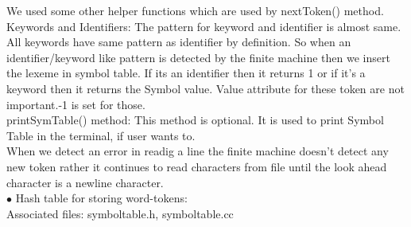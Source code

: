 \documentclass[paper=letter, fontsize=11pt]{scrartcl} %
\begin{document}
We used some other helper functions which are used by nextToken() method.\\

Keywords and Identifiers: The pattern for keyword and identifier is almost same. All keywords have same pattern as identifier by definition. So when an identifier/keyword like pattern is detected by the finite machine then we insert the lexeme in symbol table. If its an identifier then it returns 1 or if it's a keyword then it returns the Symbol value. Value attribute for these token are not important.-1 is set for those.\\

printSymTable() method: This method is optional. It is used to print Symbol Table in the terminal, if user wants to.\\

When we detect an error in readig a line the finite machine doesn't detect any new token rather it continues to read characters from file until the look ahead character is a newline character.\\

$\bullet$ Hash table for storing word-tokens: \\

Associated files: symboltable.h, symboltable.cc\\
\end{document}
